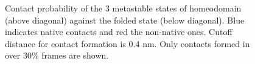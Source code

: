\documentclass[journal=jacsat,manuscript=article]{achemso}
\begin{document}
\begin{figure}[htbp]
  \centering
  \caption{\label{UVF}Contact probability of the 3 metastable states of homeodomain (above diagonal) against the folded state (below diagonal). Blue indicates native contacts and red the non-native ones. Cutoff distance for contact formation is 0.4 nm. Only contacts formed in over $30\%$ frames are shown.}
\end{figure}
\end{document}
